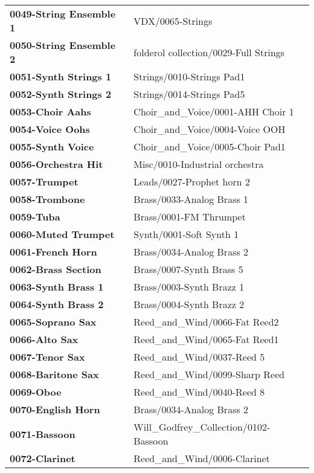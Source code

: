 \begin{longtable}{|l l|}
   \textbf{0049-String Ensemble 1} &
      VDX/0065-Strings \\
   \textbf{0050-String Ensemble 2} &
      folderol collection/0029-Full Strings \\
   \textbf{0051-Synth Strings 1} &
      Strings/0010-Strings Pad1 \\
   \textbf{0052-Synth Strings 2} &
      Strings/0014-Strings Pad5 \\
   \textbf{0053-Choir Aahs} &
      Choir\_and\_Voice/0001-AHH Choir 1 \\
   \textbf{0054-Voice Oohs} &
      Choir\_and\_Voice/0004-Voice OOH \\
   \textbf{0055-Synth Voice} &
      Choir\_and\_Voice/0005-Choir Pad1 \\
   \textbf{0056-Orchestra Hit} &
      Misc/0010-Industrial orchestra \\
   \textbf{0057-Trumpet} &
      Leads/0027-Prophet horn 2 \\
   \textbf{0058-Trombone} &
      Brass/0033-Analog Brass 1 \\
   \textbf{0059-Tuba} &
      Brass/0001-FM Thrumpet \\
   \textbf{0060-Muted Trumpet} &
      Synth/0001-Soft Synth 1 \\
   \textbf{0061-French Horn} &
      Brass/0034-Analog Brass 2 \\
   \textbf{0062-Brass Section} &
      Brass/0007-Synth Brass 5 \\
   \textbf{0063-Synth Brass 1} &
      Brass/0003-Synth Brazz 1 \\
   \textbf{0064-Synth Brass 2} &
      Brass/0004-Synth Brazz 2 \\
   \textbf{0065-Soprano Sax} &
      Reed\_and\_Wind/0066-Fat Reed2 \\
   \textbf{0066-Alto Sax} &
      Reed\_and\_Wind/0065-Fat Reed1 \\
   \textbf{0067-Tenor Sax} &
      Reed\_and\_Wind/0037-Reed 5 \\
   \textbf{0068-Baritone Sax} &
      Reed\_and\_Wind/0099-Sharp Reed \\
   \textbf{0069-Oboe} &
      Reed\_and\_Wind/0040-Reed 8 \\
   \textbf{0070-English Horn} &
      Brass/0034-Analog Brass 2 \\
   \textbf{0071-Bassoon} &
      Will\_Godfrey\_Collection/0102-Bassoon \\
   \textbf{0072-Clarinet} &
      Reed\_and\_Wind/0006-Clarinet \\

\end{longtable}
